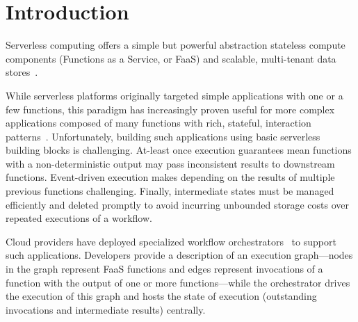 \section{Introduction}\label{sec:intro}

Serverless computing offers a simple but powerful abstraction
  stateless
compute components (Functions as a Service, or FaaS) and scalable,
multi-tenant data stores~\cite{berkeley}.
 


While serverless platforms originally targeted simple applications with one or a
few functions, this paradigm has increasingly proven useful for more complex
applications composed of many functions with rich, stateful, interaction
patterns~\cite{excamera, pywren, gg-atc, beldi, boki}. Unfortunately, building
such applications using basic serverless building blocks is challenging.
At-least once execution guarantees mean functions with a non-deterministic output may
pass inconsistent results to downstream functions. Event-driven execution makes
depending on the results of multiple previous functions challenging. Finally,
intermediate states must be managed efficiently and deleted promptly to avoid
incurring unbounded storage costs over repeated executions of a workflow.

Cloud providers have deployed specialized 
 workflow orchestrators~\cite{aws-step-functions,
google-cloud-composer, google-workflows, durable-functions} to support such
applications. 
Developers provide a description of an execution graph---nodes in the graph
represent FaaS functions and edges represent invocations of a function with
the output of one or more functions---while the orchestrator drives the
execution of this graph  and hosts the state of execution (outstanding invocations and
intermediate results) centrally.

